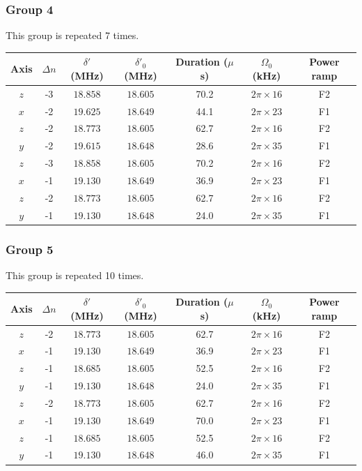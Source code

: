 \documentclass[aps,secnumarabic,amsmath,amssymb]{revtex4}
\begin{document}
\newpage
\subsubsection{Group 4}
This group is repeated 7 times.
\begin{center}
  \begin{tabular}{|c|c|c|c|c|c|c|}
    \hline
    Axis&$\Delta n$&$\delta'$ (MHz)&$\delta'_0$ (MHz)&Duration ($\mu$s)& $\Omega_0$ (kHz)&Power ramp\\\hline
    $z$&-3&$18.858$&$18.605$&70.2&$2\pi\times16$&F2\\\hline
    $x$&-2&$19.625$&$18.649$&44.1&$2\pi\times23$&F1\\\hline
    $z$&-2&$18.773$&$18.605$&62.7&$2\pi\times16$&F2\\\hline
    $y$&-2&$19.615$&$18.648$&28.6&$2\pi\times35$&F1\\\hline
    $z$&-3&$18.858$&$18.605$&70.2&$2\pi\times16$&F2\\\hline
    $x$&-1&$19.130$&$18.649$&36.9&$2\pi\times23$&F1\\\hline
    $z$&-2&$18.773$&$18.605$&62.7&$2\pi\times16$&F2\\\hline
    $y$&-1&$19.130$&$18.648$&24.0&$2\pi\times35$&F1\\\hline
  \end{tabular}
\end{center}
\subsubsection{Group 5}
This group is repeated 10 times.
\begin{center}
  \begin{tabular}{|c|c|c|c|c|c|c|}
    \hline
    Axis&$\Delta n$&$\delta'$ (MHz)&$\delta'_0$ (MHz)&Duration ($\mu$s)& $\Omega_0$ (kHz)&Power ramp\\\hline
    $z$&-2&$18.773$&$18.605$&62.7&$2\pi\times16$&F2\\\hline
    $x$&-1&$19.130$&$18.649$&36.9&$2\pi\times23$&F1\\\hline
    $z$&-1&$18.685$&$18.605$&52.5&$2\pi\times16$&F2\\\hline
    $y$&-1&$19.130$&$18.648$&24.0&$2\pi\times35$&F1\\\hline
    $z$&-2&$18.773$&$18.605$&62.7&$2\pi\times16$&F2\\\hline
    $x$&-1&$19.130$&$18.649$&70.0&$2\pi\times23$&F1\\\hline
    $z$&-1&$18.685$&$18.605$&52.5&$2\pi\times16$&F2\\\hline
    $y$&-1&$19.130$&$18.648$&46.0&$2\pi\times35$&F1\\\hline
  \end{tabular}
\end{center}
\end{document}
